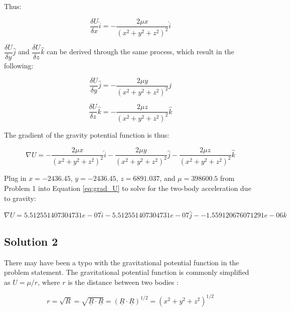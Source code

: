 \documentclass[conf]{new-aiaa}
\begin{document}
Thus: 

\begin{equation}
\dfrac{\delta U}{\delta x} \hat{i} = -\dfrac{2 \mu x}{ (x^2 + y^2 + z^2 )^2 } \hat{i}
\end{equation}

$\dfrac{\delta U}{\delta y} \hat{j} $ and $\dfrac{\delta U}{\delta z} \hat{k} $ can be derived through the same process, which result in the following: 

\begin{equation}
\dfrac{\delta U}{\delta y} \hat{j} = -\dfrac{2 \mu y}{ (x^2 + y^2 + z^2 )^2 } \hat{j}
\end{equation}

\begin{equation}
\dfrac{\delta U}{\delta z} \hat{k} = -\dfrac{2 \mu z}{ (x^2 + y^2 + z^2 )^2 } \hat{k}
\end{equation}

The gradient of the gravity potential function is thus: 

\begin{equation}
\nabla U = -\dfrac{2 \mu x}{ (x^2 + y^2 + z^2 )^2 } \hat{i} -\dfrac{2 \mu y}{ (x^2 + y^2 + z^2 )^2 } \hat{j} -\dfrac{2 \mu z}{ (x^2 + y^2 + z^2 )^2 } \hat{k}
\label{eq:grad_U}
\end{equation}

Plug in $x = -2436.45$, $y = -2436.45$, $z = 6891.037$, and $\mu = 398600.5$ from Problem 1 into Equation \ref{eq:grad_U} to solve for the two-body acceleration due to gravity: 

\begin{equation}
\nabla U = 5.512551407304731e-07 \hat{i} - 5.512551407304731e-07 \hat{j} - -1.559120676071291e-06 \hat{k} 
\end{equation}

\subsection{Solution 2}

There may have been a typo with the gravitational potential function in the problem statement. The gravitational potential function is commonly simplified as $U = \mu/r$, where $r$ is the distance between two bodies \cite{bate_astrodynamics}: 

\begin{equation}
r = \sqrt{R} = \sqrt{\underline{R} \cdot \underline{R}} = ( \underline{R} \cdot \underline{R} )^{1/2} = ( x^2 + y^2 + z^2 )^{1/2}
\label{eq:U_r}
\end{equation}
\end{document}
